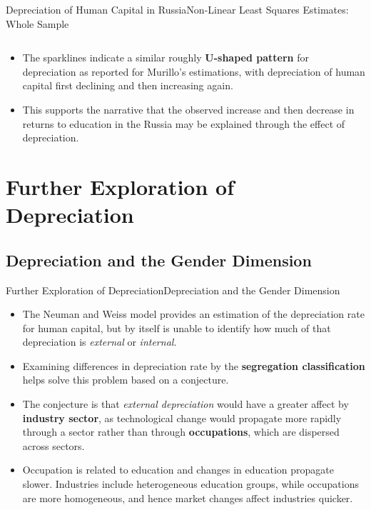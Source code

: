 \documentclass{beamer}
\begin{document}
\begin{frame}{Depreciation of Human Capital in Russia}{Non-Linear Least Squares Estimates: Whole Sample}
\begin{tabularx}{\textwidth}{clccccccc}
		\end{tabularx}
	\fontsize{8}{10}\selectfont
\begin{itemize}
	\item The sparklines indicate a similar roughly\textbf{ U-shaped pattern} for depreciation as reported for Murillo's estimations, with depreciation of human capital first declining and then increasing again. 
	\item This supports the narrative that the observed increase and then decrease in returns to education in the Russia may be explained through the	effect of depreciation.
\end{itemize}
\end{frame}		

\section{Further Exploration of Depreciation}
	\subsection{Depreciation and the Gender Dimension}

\begin{frame}{Further Exploration of Depreciation}{Depreciation and the Gender Dimension}
	\begin{itemize}
		\item The Neuman and Weiss model provides an estimation of the depreciation rate for human	capital, but by itself is unable to identify how much of that depreciation is \textit{external} or \textit{internal}.
		\item Examining differences in depreciation rate by the \textbf{segregation classification} helps solve this problem based on a conjecture.
		\item The conjecture is that \textit{external depreciation} would have a greater affect by \textbf{industry sector}, as technological change would propagate more rapidly through a sector rather than through \textbf{occupations}, which are dispersed across sectors.
		\item Occupation is related to education and changes in education propagate slower. Industries include heterogeneous education groups, while occupations are more homogeneous, and hence market changes affect industries quicker.
	\end{itemize}
\end{frame}	
	
\end{document}

